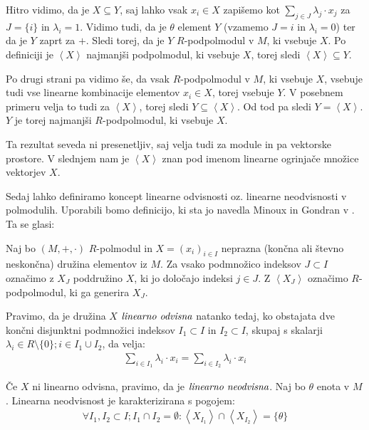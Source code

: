 \documentclass[mat1]{fmfdelo}
\newcommand{\pojem}[1]{\ensuremath{\emph{#1}}}
\newcommand{\Gen}[1]{\ensuremath{\left<{#1}\right>}}
\begin{document}
\begin{dokaz}
	
	Hitro vidimo, da je $X \subseteq Y$, saj lahko vsak $x_i\in X$ zapišemo kot $\sum_{j\in J}\lambda_j\cdot x_j$ za $J = \{i\}$ in $\lambda_i = 1$. Vidimo tudi, da je $\theta$ element $Y$ (vzamemo $J = {i}$ in $\lambda_i = 0$) ter da je $Y$ zaprt za $+$. Sledi torej, da je $Y$ $R$-podpolmodul v $M$, ki vsebuje $X$. Po definiciji je $\Gen{X}$ najmanjši podpolmodul, ki vsebuje $X$, torej sledi $\Gen{X} \subseteq Y$. 
	
	Po drugi strani pa vidimo še, da vsak $R$-podpolmodul v $M$, ki vsebuje $X$, vsebuje tudi vse linearne kombinacije elementov $x_i\in X$, torej vsebuje $Y$. V posebnem primeru velja to tudi za \Gen{X}, torej sledi $Y \subseteq \Gen{X}$. Od tod pa sledi $Y = \Gen{X}$. $Y$ je torej najmanjši $R$-podpolmodul, ki vsebuje $X$.
\end{dokaz}

Ta rezultat seveda ni presenetljiv, saj velja tudi za module in pa vektorske prostore. V slednjem nam je \Gen{X} znan pod imenom linearne ogrinjače množice vektorjev $X$.

Sedaj lahko definiramo koncept linearne odvisnosti oz. linearne neodvisnosti v polmodulih. Uporabili bomo definicijo, ki sta jo navedla Minoux in Gondran v \cite[poglavje 5, definicija 2.\,5.\,1.\,]{bib:Gondran}. Ta se glasi:

\begin{definicija}
	\label{def:linneodv1}
	Naj bo $(M, +, \cdot)$ $R$-polmodul in $X = (x_i)_{i \in I}$ neprazna (končna ali števno neskončna) družina elementov iz $M$. Za vsako podmnožico indeksov $J \subset I$ označimo z $X_J$ poddružino $X$, ki jo določajo indeksi $j\in J$. Z $\Gen{X_J}$ označimo $R$-podpolmodul, ki ga generira $X_J$.
	
	Pravimo, da je družina $X$ \pojem{linearno odvisna} natanko tedaj, ko obstajata dve končni disjunktni podmnožici indeksov $I_1\subset I$ in $I_2\subset I$, skupaj s skalarji $\lambda_i \in R\setminus\{0\}; i\in I_1\cup I_2$, da velja: \begin{align}
		\sum_{i \in I_1}\lambda_i\cdot x_i = \sum_{i \in I_2}\lambda_i\cdot x_i 
	\end{align}

	Če $X$ ni linearno odvisna, pravimo, da je \pojem{linearno neodvisna}. Naj bo $\theta$ enota v $M$. Linearna neodvisnost je karakterizirana s pogojem: \begin{align}
		\forall I_1, I_2 \subset I; I_1\cap I_2 =\emptyset: \Gen{X_{I_1}}\cap\Gen{X_{I_2}} = \{\theta\}
	\end{align}
\end{definicija}
\end{document}
